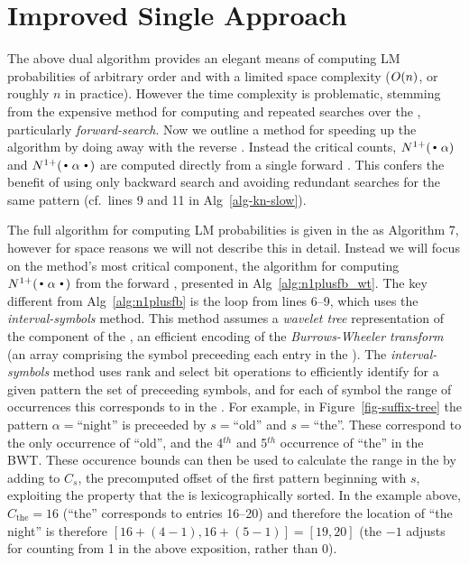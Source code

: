 \section{Improved Single \CST Approach}
\label{sec-single-cst}

The above dual \CST algorithm provides an elegant means of computing LM probabilities of arbitrary order and with a limited space complexity ($O(n)$, or roughly $n$ in practice).
However the time complexity is problematic, stemming from the expensive method for computing \nlplusfrontbackname and repeated searches over the \CST, particularly \emph{forward-search}.
Now we outline a method for speeding up the algorithm by doing away with the reverse \CST.
Instead the critical counts, $\nlplus{\dotpat}$ and $\nlplus{\dotpatdot}$ are computed directly from a single forward \CST. 
This confers the benefit of using only backward search and avoiding redundant searches for the same pattern (cf.~lines 9 and 11 in Alg~\ref{alg-kn-slow}).


The full algorithm for computing LM probabilities is given in the \supp as Algorithm 7, however for space reasons we will not describe this in detail.
Instead we will focus on the method's most critical component, the algorithm for computing $\nlplus{\dotpatdot}$ from the forward \CST, presented in Alg~\ref{alg:n1plusfb_wt}.
The key different from Alg~\ref{alg:n1plusfb} is the loop from lines 6--9, which uses the \emph{interval-symbols} method.
This method assumes a \emph{wavelet tree} representation of the \SA component of the \CST, an efficient encoding of the \emph{Burrows-Wheeler transform} (an array comprising the symbol preceeding each entry in the \SA).
The \emph{interval-symbols} method uses rank and select bit operations to efficiently identify for a given pattern the set of preceeding symbols, and for each of symbol the range of occurrences this corresponds to in the \SA.
For example, in Figure~\ref{fig-suffix-tree} the pattern $\alpha=\text{``night''}$ is preceeded by $s=$``old'' and $s=$``the''.
These correspond to the only occurrence of ``old'', and the 4$^{th}$ and 5$^{th}$ occurrence of ``the'' in the BWT.
These occurence bounds can then be used to calculate the range in the \SA by adding to $C_s$, the precomputed offset of the first pattern beginning with $s$, exploiting the property that the \SA is lexicographically sorted.
In the example above, $C_{\text{the}} = 16$ (``the'' corresponds to \SA entries 16--20) and therefore the location of ``the night'' is therefore $[16+(4-1),16+(5-1)] = [19,20]$ (the $-1$ adjusts for counting from 1 in the above exposition, rather than 0).


